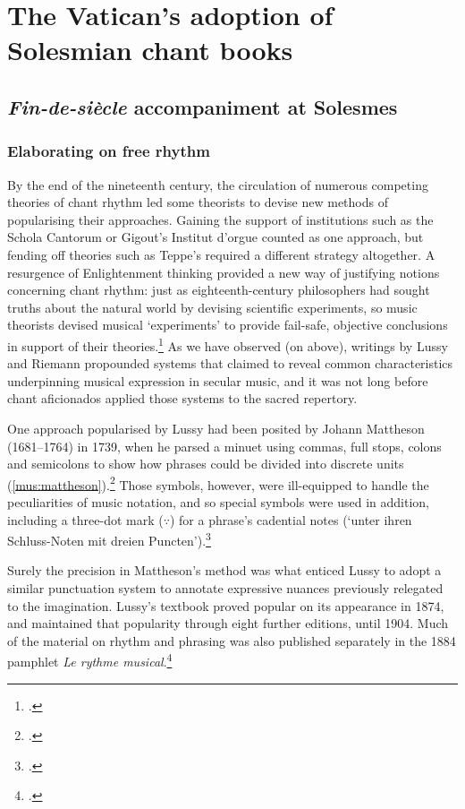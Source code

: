\chapter{The Vatican's adoption of Solesmian chant books}
\section{\emph{Fin-de-siècle} accompaniment at Solesmes}
\subsection{Elaborating on free rhythm}
\label{sc:moc_paleo}%
By the end of the nineteenth century, the circulation of numerous competing theories of chant rhythm led some theorists to devise new methods of popularising their approaches.
Gaining the support of institutions such as the Schola Cantorum or Gigout's Institut d'orgue counted as one approach, but fending off theories such as Teppe's required a different strategy altogether.
%
A resurgence of Enlightenment thinking provided a new way of justifying notions concerning chant rhythm: just as eighteenth-century philosophers had sought truths about the natural world by devising scientific experiments, so music theorists devised musical `experiments' to provide fail-safe, objective conclusions in support of their theories.\footcite[197]{GreenMathisLussyTraite1994}
As we have observed (on  above), writings by Lussy and Riemann propounded systems that claimed to reveal common characteristics underpinning musical expression in secular music, and it was not long before chant aficionados applied those systems to the sacred repertory.

One approach popularised by Lussy had been posited by Johann Mattheson (1681--1764) in 1739, when he parsed a minuet using commas, full stops, colons and semicolons to show how phrases could be divided into discrete units (\cref{mus:mattheson}).\footcite[For a discussion of the approach in the seventeenth century, see][41]{VialArtMusicalPhrasing2008}
Those symbols, however, were ill-equipped to handle the peculiarities of music notation, and so special symbols were used in addition, including a three-dot mark ($\because$) for a phrase's cadential notes (`unter ihren Schluss-Noten mit dreien Puncten').\footcite[p.~224, \S{}82]{MatthesonvolkommeneCapellmeister1739}

Surely the precision in Mattheson's method was what enticed Lussy to adopt a similar punctuation system to annotate expressive nuances previously relegated to the imagination.
Lussy's textbook proved popular on its appearance in 1874, and maintained that popularity through eight further editions, until 1904.
Much of the material on rhythm and phrasing was also published separately in the 1884 pamphlet \emph{Le rythme musical}.\footcite[52]{Lussyrythmemusicalson1884}

